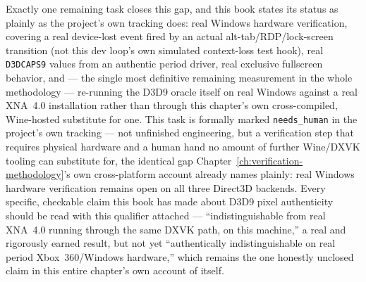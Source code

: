 Exactly one remaining task closes this gap, and this book states its status as plainly as the
project's own tracking does: real Windows hardware verification, covering a real device-lost
event fired by an actual alt-tab/RDP/lock-screen transition (not this dev loop's own simulated
context-loss test hook), real \texttt{D3DCAPS9} values from an authentic period driver, real
exclusive fullscreen behavior, and --- the single most definitive remaining measurement in the
whole methodology --- re-running the D3D9 oracle itself on real Windows against a real XNA~4.0
installation rather than through this chapter's own cross-compiled, Wine-hosted substitute for
one. This task is formally marked \texttt{needs\_human} in the project's own tracking --- not
unfinished engineering, but a verification step that requires physical hardware and a human
hand no amount of further Wine/DXVK tooling can substitute for, the identical gap
Chapter~\ref{ch:verification-methodology}'s own cross-platform account already names plainly:
real Windows hardware verification remains open on all three Direct3D backends. Every specific,
checkable claim this book has made about D3D9 pixel authenticity should be read with this
qualifier attached --- ``indistinguishable from real XNA~4.0 running through the same DXVK
path, on this machine,'' a real and rigorously earned result, but not yet ``authentically
indistinguishable on real period Xbox~360/Windows hardware,'' which remains the one honestly
unclosed claim in this entire chapter's own account of itself.
